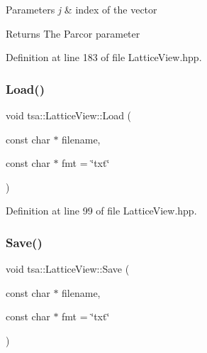 \begin{DoxyParams}{Parameters}
{\em j} & index of the vector \\
\hline
\end{DoxyParams}
\begin{DoxyReturn}{Returns}
The Parcor parameter 
\end{DoxyReturn}


Definition at line 183 of file Lattice\+View.\+hpp.

\mbox{\label{classtsa_1_1_lattice_view_a4a8f6b4faf4a5c61cbd66aab056e18ab}} 
\subsubsection{\texorpdfstring{Load()}{Load()}}
{\footnotesize\ttfamily void tsa\+::\+Lattice\+View\+::\+Load (\begin{DoxyParamCaption}\item[{const char $\ast$}]{filename,  }\item[{const char $\ast$}]{fmt = {\ttfamily \char`\"{}txt\char`\"{}} }\end{DoxyParamCaption})\hspace{0.3cm}{\ttfamily [inline]}}



Definition at line 99 of file Lattice\+View.\+hpp.

\mbox{\label{classtsa_1_1_lattice_view_a911eefc09c14ed78dee42fffe237ac3a}} 
\subsubsection{\texorpdfstring{Save()}{Save()}}
{\footnotesize\ttfamily void tsa\+::\+Lattice\+View\+::\+Save (\begin{DoxyParamCaption}\item[{const char $\ast$}]{filename,  }\item[{const char $\ast$}]{fmt = {\ttfamily \char`\"{}txt\char`\"{}} }\end{DoxyParamCaption})\hspace{0.3cm}{\ttfamily [inline]}}



